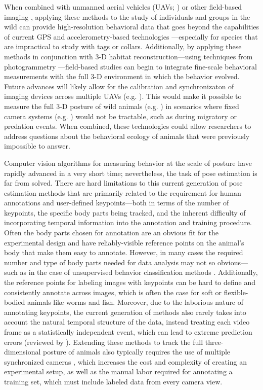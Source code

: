\documentclass[11pt,a4paper,oneside]{book}
\begin{document}
When combined with unmanned aerial vehicles (UAVs; \citealt{schiffman2014drones}) or other field-based imaging \citep{fritz2019lowcost}, applying these methods to the study of individuals and groups in the wild can provide high-resolution behavioral data that goes beyond the capabilities of current GPS and accelerometry-based technologies \citep{nagy2010hierarchical,nagy2013context,kays2015terrestrial,strandburg2015shared,strandburg2017habitat,flack2018local}—especially for species that are impractical to study with tags or collars. Additionally, by applying these methods in conjunction with 3-D habitat reconstruction—using techniques from photogrammetry  \citep{strandburg2017habitat, fritz2019lowcost}—field-based studies can begin to integrate fine-scale behavioral measurements with the full 3-D environment in which the behavior evolved. Future advances will likely allow for the calibration and synchronizaton of imaging devices across multiple UAVs (e.g. \citealt{price2018deep, Nitin_ICCV_19}). This would make it possible to measure the full 3-D posture of wild animals (e.g. \citealt{Zuffi:ICCV:2019}) in scenarios where fixed camera systems (e.g. \citealt{nath2018}) would not be tractable, such as during migratory or predation events. When combined, these technologies could allow researchers to address questions about the behavioral ecology of animals that were previously impossible to answer.

Computer vision algorithms for measuring behavior at the scale of posture have rapidly advanced in a very short time; nevertheless, the task of pose estimation is far from solved. There are hard limitations to this current generation of pose estimation methods that are primarily related to the requirement for human annotations and user-defined keypoints---both in terms of the number of keypoints, the specific body parts being tracked, and the inherent difficulty of incorporating temporal information into the annotation and training procedure. Often the body parts chosen for annotation are an obvious fit for the experimental design and have reliably-visible reference points on the animal's body that make them easy to annotate. However, in many cases the required number and type of body parts needed for data analysis may not so obvious---such as in the case of unsupervised behavior classification methods \citep{berman2014mapping, pereira2019fast}. Additionally, the reference points for labeling images with keypoints can be hard to define and consistently annotate across images, which is often the case for soft or flexible-bodied animals like worms and fish. Moreover, due to the laborious nature of annotating keypoints, the current generation of methods also rarely takes into account the natural temporal structure of the data, instead treating each video frame as a statistically independent event, which can lead to extreme prediction errors (reviewed by \citealt{seethapathi2019movement}). Extending these methods to track the full three-dimensional posture of animals also typically requires the use of multiple synchronized cameras \citep{nath2018, gunel2019deepfly3d}, which increases the cost and complexity of creating an experimental setup, as well as the manual labor required for annotating a training set, which must include labeled data from every camera view.
\end{document}
